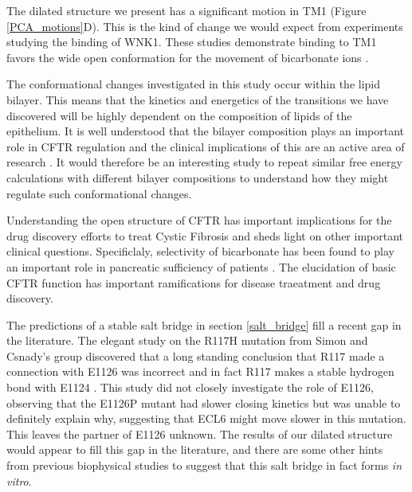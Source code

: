 The dilated structure we present has a significant motion in TM1 (Figure \ref{PCA_motions}D). This is the kind of change we would expect from experiments studying the binding of WNK1. These studies demonstrate binding to TM1 favors the wide open conformation for the movement of bicarbonate ions \cite{kim2019}. 


The conformational changes investigated in this study occur within the lipid bilayer. This means that the kinetics and energetics of the transitions we have discovered will be highly dependent on the composition of lipids of the epithelium. It is well understood that the bilayer composition plays an important role in CFTR regulation and the clinical implications of this are an active area of research \cite{cui2020, cottrill2020}. It would therefore be an interesting study to repeat similar free energy calculations with different bilayer compositions to understand how they might regulate such conformational changes.

Understanding the open structure of CFTR has important implications for the drug discovery efforts to treat Cystic Fibrosis and sheds light on other important clinical questions. Specificlaly, selectivity of bicarbonate has been found to play an important role in pancreatic sufficiency of patients \cite{kim2019}. The elucidation of basic CFTR function has important ramifications for disease traeatment and drug discovery. 

The predictions of a stable salt bridge in section \ref{salt_bridge} fill a recent gap in the literature. The elegant study on the R117H mutation from Simon and Csnady's group \cite{simon2021}  discovered that a long standing conclusion that R117 made a connection with E1126 was incorrect and in fact R117 makes a stable hydrogen bond with E1124 \cite{cui2014}. This study did not closely investigate the role of E1126, observing that the E1126P mutant had slower closing kinetics but was unable to definitely explain why, suggesting that ECL6 might move slower in this mutation. This leaves the partner of E1126 unknown. The results of our dilated structure would appear to fill this gap in the literature, and there are some other hints from previous biophysical studies to suggest that this salt bridge in fact forms \textit {in vitro}.

